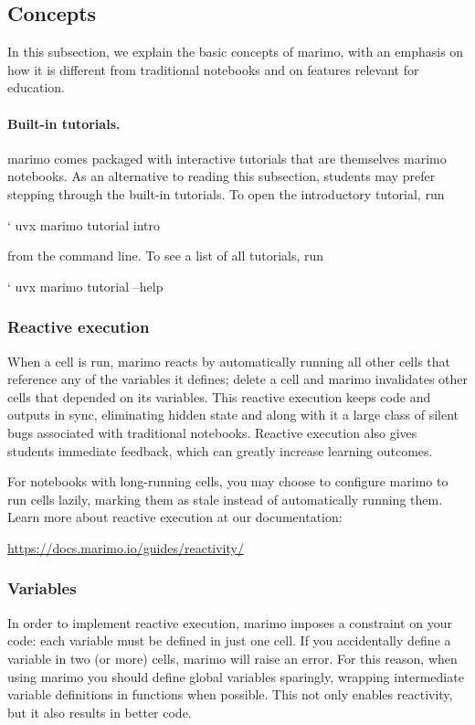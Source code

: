 \documentclass{article}
\begin{document}
\subsection{Concepts}
In this subsection, we explain the basic concepts of marimo, with an emphasis on how it is
different from traditional notebooks and on features relevant for education.

\paragraph{Built-in tutorials.} marimo comes packaged with interactive tutorials that
are themselves marimo notebooks. As an alternative to reading this subsection, students 
may prefer stepping through the built-in tutorials. To open the introductory
tutorial, run
\begin{shellcmd}
` uvx marimo tutorial intro
\end{shellcmd}
from the command line. To see a list of all tutorials, run
\begin{shellcmd}
` uvx marimo tutorial --help
\end{shellcmd}


\subsubsection{Reactive execution} When a cell is run, marimo reacts by
automatically running all other cells that reference any of the variables it
defines; delete a cell and marimo invalidates other cells that depended on its
variables. This reactive execution keeps code and outputs in sync, eliminating
hidden state and along with it a large class of silent bugs associated with
traditional notebooks. Reactive execution also gives students immediate feedback,
which can greatly increase learning outcomes.

For notebooks with long-running cells, you may choose to configure marimo to
run cells lazily, marking them as stale instead of automatically running them.
Learn more about reactive execution at our documentation:

\begin{center}
  \url{https://docs.marimo.io/guides/reactivity/}
\end{center}

\subsubsection{Variables} In order to implement reactive
execution, marimo imposes a constraint on your code: each variable must
be defined in just one cell. If you accidentally define a variable in two (or
more) cells, marimo will raise an error. For this reason, when using marimo you
should define global variables sparingly, wrapping intermediate variable
definitions in functions when possible. This not only enables reactivity, but
it also results in better code.
\end{document}
